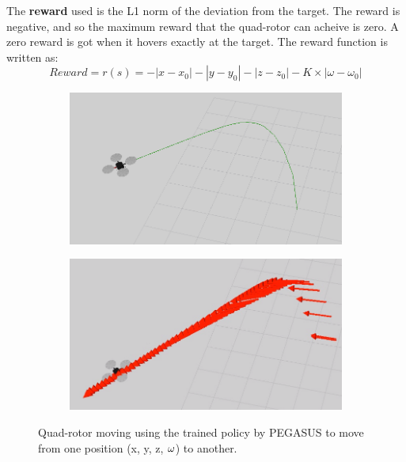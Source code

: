 \documentclass[hidelinks,BTech]{iitmdiss}
\begin{document}
The {\bf reward} used is the L1 norm of the deviation from the target. The reward is negative, and so the maximum reward that the quad-rotor can acheive is zero. A zero reward is got when it hovers exactly at the target. The reward function is written as:
\begin{equation}
  Reward = r(s) = - |x - x_0| - |y - y_0| - |z - z_0| - K \times |\omega - \omega_0|
\end{equation}

\begin{figure}[H]
  \centering
    \begin{subfigure}[t]{0.45\textwidth}
      \centering
        \includegraphics[width=\textwidth]{quadrotor_position_control.png}
    \end{subfigure}
    \begin{subfigure}[t]{0.45\textwidth}
      \centering
        \includegraphics[width=\textwidth]{quadrotor_position_control2.png}
    \end{subfigure}
    \caption{Quad-rotor moving using the trained policy by PEGASUS to move from one position (x, y, z, $\protect\omega$) to another.}
\end{figure}
\end{document}
